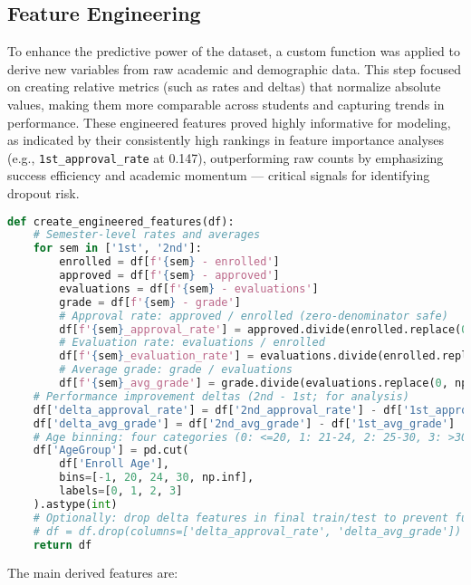 \documentclass[twoside,final]{hcmut-report}
\begin{document}
\subsection{Feature Engineering}
To enhance the predictive power of the dataset, a custom function was applied to derive new variables from raw academic and demographic data. This step focused on creating relative metrics (such as rates and deltas) that normalize absolute values, making them more comparable across students and capturing trends in performance. These engineered features proved highly informative for modeling, as indicated by their consistently high rankings in feature importance analyses (e.g., \texttt{1st\_approval\_rate} at 0.147), outperforming raw counts by emphasizing success efficiency and academic momentum — critical signals for identifying dropout risk.
\begin{lstlisting}[language=python]
def create_engineered_features(df):
    # Semester-level rates and averages
    for sem in ['1st', '2nd']:
        enrolled = df[f'{sem} - enrolled']
        approved = df[f'{sem} - approved']
        evaluations = df[f'{sem} - evaluations']
        grade = df[f'{sem} - grade']
        # Approval rate: approved / enrolled (zero-denominator safe)
        df[f'{sem}_approval_rate'] = approved.divide(enrolled.replace(0, np.nan)).fillna(0)
        # Evaluation rate: evaluations / enrolled
        df[f'{sem}_evaluation_rate'] = evaluations.divide(enrolled.replace(0, np.nan)).fillna(0)
        # Average grade: grade / evaluations
        df[f'{sem}_avg_grade'] = grade.divide(evaluations.replace(0, np.nan)).fillna(0)
    # Performance improvement deltas (2nd - 1st; for analysis)
    df['delta_approval_rate'] = df['2nd_approval_rate'] - df['1st_approval_rate']
    df['delta_avg_grade'] = df['2nd_avg_grade'] - df['1st_avg_grade']
    # Age binning: four categories (0: <=20, 1: 21-24, 2: 25-30, 3: >30)
    df['AgeGroup'] = pd.cut(
        df['Enroll Age'],
        bins=[-1, 20, 24, 30, np.inf],
        labels=[0, 1, 2, 3]
    ).astype(int)
    # Optionally: drop delta features in final train/test to prevent future-data leakage
    # df = df.drop(columns=['delta_approval_rate', 'delta_avg_grade'])
    return df
\end{lstlisting}
The main derived features are:
\end{document}
